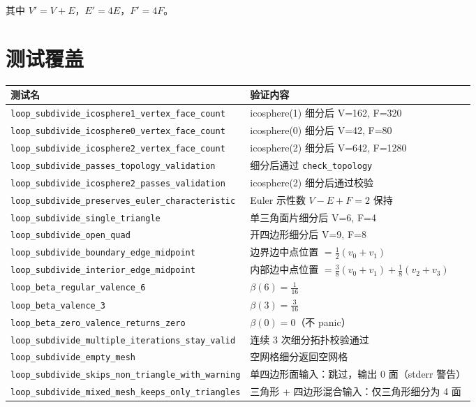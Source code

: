 \documentclass[11pt,a4paper]{article}
\begin{document}
其中 $V' = V + E$，$E' = 4E$，$F' = 4F$。

\section{测试覆盖}

\begin{center}
\renewcommand{\arraystretch}{1.18}
\begin{tabular}{@{}ll@{}}
  \toprule
  \textbf{测试名} & \textbf{验证内容} \\
  \midrule
  \texttt{loop\_subdivide\_icosphere1\_vertex\_face\_count} & icosphere(1) 细分后 V=162, F=320 \\
  \texttt{loop\_subdivide\_icosphere0\_vertex\_face\_count} & icosphere(0) 细分后 V=42, F=80 \\
  \texttt{loop\_subdivide\_icosphere2\_vertex\_face\_count} & icosphere(2) 细分后 V=642, F=1280 \\
  \texttt{loop\_subdivide\_passes\_topology\_validation}   & 细分后通过 \texttt{check\_topology} \\
  \texttt{loop\_subdivide\_icosphere2\_passes\_validation} & icosphere(2) 细分后通过校验 \\
  \texttt{loop\_subdivide\_preserves\_euler\_characteristic} & Euler 示性数 $V{-}E{+}F{=}2$ 保持 \\
  \texttt{loop\_subdivide\_single\_triangle}               & 单三角面片细分后 V=6, F=4 \\
  \texttt{loop\_subdivide\_open\_quad}                     & 开四边形细分后 V=9, F=8 \\
  \texttt{loop\_subdivide\_boundary\_edge\_midpoint}       & 边界边中点位置 $= \frac{1}{2}(v_0{+}v_1)$ \\
  \texttt{loop\_subdivide\_interior\_edge\_midpoint}       & 内部边中点位置 $= \frac{3}{8}(v_0{+}v_1) + \frac{1}{8}(v_2{+}v_3)$ \\
  \texttt{loop\_beta\_regular\_valence\_6}                 & $\beta(6) = \frac{1}{16}$ \\
  \texttt{loop\_beta\_valence\_3}                          & $\beta(3) = \frac{3}{16}$ \\
  \texttt{loop\_beta\_zero\_valence\_returns\_zero}        & $\beta(0) = 0$（不 panic） \\
  \texttt{loop\_subdivide\_multiple\_iterations\_stay\_valid} & 连续 3 次细分拓扑校验通过 \\
  \texttt{loop\_subdivide\_empty\_mesh}                    & 空网格细分返回空网格 \\
  \midrule
  \texttt{loop\_subdivide\_skips\_non\_triangle\_with\_warning} & 单四边形面输入：跳过，输出 0 面（stderr 警告） \\
  \texttt{loop\_subdivide\_mixed\_mesh\_keeps\_only\_triangles} & 三角形 + 四边形混合输入：仅三角形细分为 4 面 \\
  \bottomrule
\end{tabular}
\end{center}
\end{document}
